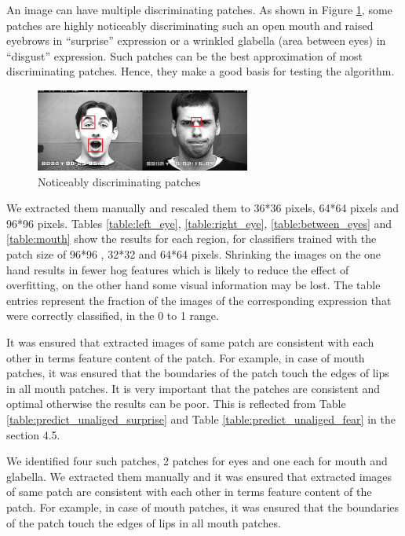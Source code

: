 An image can have multiple discriminating patches. As shown in Figure \ref{fig:manual_patch}, some patches are highly noticeably discriminating such an open mouth and raised eyebrows in "`surprise"' expression or a wrinkled glabella (area between eyes) in "`disgust"' expression. Such patches can be the best approximation of most discriminating patches. Hence, they make a good basis for testing the algorithm.

\begin{figure}
\centering
\includegraphics[width=200pt]{img/manual_patch.png}
  \caption{Noticeably discriminating patches}
  \label{fig:manual_patch}
\end{figure}


We extracted them manually and rescaled them to 36*36 pixels, 64*64 pixels and 96*96 pixels. Tables \ref{table:left_eye}, \ref{table:right_eye}, \ref{table:between_eyes} and \ref{table:mouth} show the results for each region, for classifiers trained  with the  patch size of 96*96 , 32*32 and 64*64 pixels. Shrinking the images on the one hand results in fewer hog features which is likely to reduce the effect of overfitting, on the other hand some visual information may be lost. The table entries represent the fraction of the images of the corresponding expression that were correctly classified, in the 0 to 1 range.

It was ensured that extracted images of same patch are consistent with each other in terms feature content of the patch. For example, in case of mouth patches, it was ensured that the boundaries of the patch touch the edges of lips in all mouth patches.  It is very important that the patches are consistent and optimal otherwise the results can be poor. This is reflected from Table \ref{table:predict_unaliged_surprise} and Table \ref{table:predict_unaliged_fear} in the section 4.5.


We identified four such patches, 2 patches for eyes and one each for mouth and glabella. We extracted them manually and it was ensured that extracted images of same patch are consistent with each other in terms feature content of the patch. For example, in case of mouth patches, it was ensured that the boundaries of the patch touch the edges of lips in all mouth patches.
